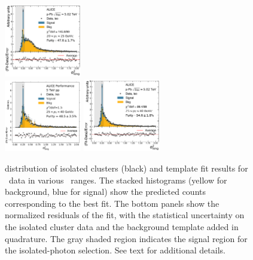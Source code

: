 \begin{figure}[h]
\includegraphics[width=0.3\textwidth]{Data_Analysis/Purity/tf-example-p-Pb-cluster_Lambda-20-25.pdf}
\\
\includegraphics[width=0.3\textwidth]{Data_Analysis/Purity/tf-example-pp-cluster_Lambda-25-40.pdf}
\includegraphics[width=0.3\textwidth]{Data_Analysis/Purity/tf-example-p-Pb-cluster_Lambda-25-40.pdf}
\caption{\lambdasquare distribution of isolated clusters (black) and template fit results for \pPb~data in various \pt~ranges. The stacked histograms (yellow for background, blue for signal) show the predicted counts corresponding to the best fit. The bottom panels show the normalized residuals of the fit, with the statistical uncertainty on the isolated cluster data and the background template added in quadrature. The gray shaded region indicates the signal region for the isolated-photon selection. See text for additional details.}
\label{TemplateFit}
\end{figure}

